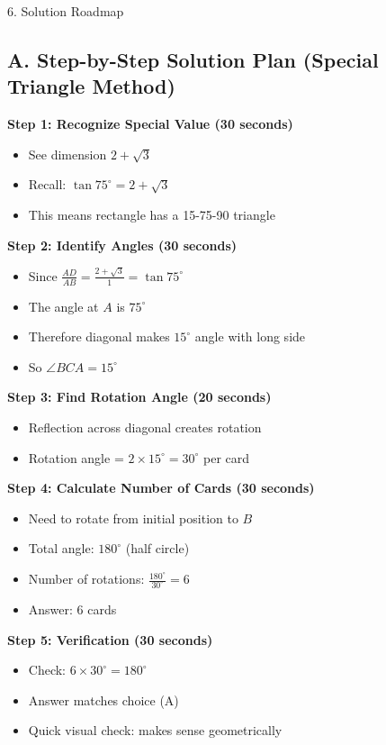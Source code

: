 \documentclass[12pt]{article}
\begin{document}
\begin{roadmapbox}{6. Solution Roadmap}

\subsection*{A. Step-by-Step Solution Plan (Special Triangle Method)}

\textbf{Step 1: Recognize Special Value (30 seconds)}
\begin{itemize}
    \item See dimension $2+\sqrt{3}$
    \item Recall: $\tan 75^\circ = 2+\sqrt{3}$
    \item This means rectangle has a 15-75-90 triangle
\end{itemize}

\textbf{Step 2: Identify Angles (30 seconds)}
\begin{itemize}
    \item Since $\frac{AD}{AB} = \frac{2+\sqrt{3}}{1} = \tan 75^\circ$
    \item The angle at $A$ is $75^\circ$
    \item Therefore diagonal makes $15^\circ$ angle with long side
    \item So $\angle BCA = 15^\circ$
\end{itemize}

\textbf{Step 3: Find Rotation Angle (20 seconds)}
\begin{itemize}
    \item Reflection across diagonal creates rotation
    \item Rotation angle = $2 \times 15^\circ = 30^\circ$ per card
\end{itemize}

\textbf{Step 4: Calculate Number of Cards (30 seconds)}
\begin{itemize}
    \item Need to rotate from initial position to $B$
    \item Total angle: $180^\circ$ (half circle)
    \item Number of rotations: $\frac{180^\circ}{30^\circ} = 6$
    \item Answer: 6 cards
\end{itemize}

\textbf{Step 5: Verification (30 seconds)}
\begin{itemize}
    \item Check: $6 \times 30^\circ = 180^\circ$ \checkmark
    \item Answer matches choice (A)
    \item Quick visual check: makes sense geometrically
\end{itemize}


\end{roadmapbox}
\end{document}
